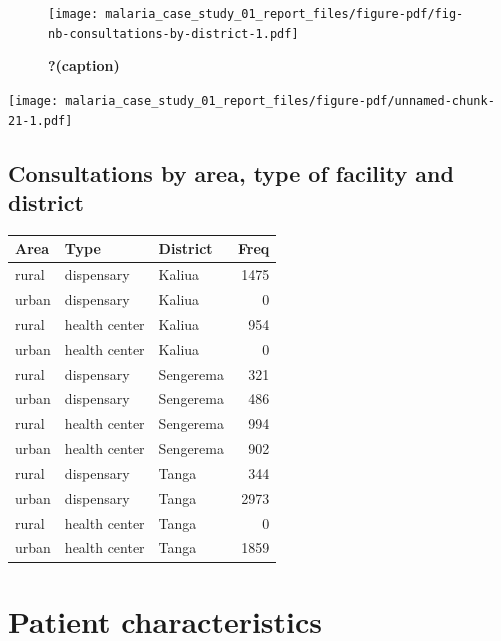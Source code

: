 \documentclass[
  letterpaper,
  DIV=11,
  numbers=noendperiod,
  oneside]{scrreprt}
\begin{document}
\begin{figure}

{\centering \texttt{[image: malaria\_case\_study\_01\_report\_files/figure-pdf/fig-nb-consultations-by-district-1.pdf]}

}

\caption{\label{fig-nb-consultations-by-district}\textbf{?(caption)}}

\end{figure}

\texttt{[image: malaria\_case\_study\_01\_report\_files/figure-pdf/unnamed-chunk-21-1.pdf]}

\hypertarget{consultations-by-area-type-of-facility-and-district}{%
\subsection{Consultations by area, type of facility and
district}\label{consultations-by-area-type-of-facility-and-district}}

\begin{longtable}[]{@{}lllr@{}}
\toprule\noalign{}
Area & Type & District & Freq \\
\midrule\noalign{}
\endhead
\bottomrule\noalign{}
\endlastfoot
rural & dispensary & Kaliua & 1475 \\
urban & dispensary & Kaliua & 0 \\
rural & health center & Kaliua & 954 \\
urban & health center & Kaliua & 0 \\
rural & dispensary & Sengerema & 321 \\
urban & dispensary & Sengerema & 486 \\
rural & health center & Sengerema & 994 \\
urban & health center & Sengerema & 902 \\
rural & dispensary & Tanga & 344 \\
urban & dispensary & Tanga & 2973 \\
rural & health center & Tanga & 0 \\
urban & health center & Tanga & 1859 \\
\end{longtable}

\hypertarget{patient-characteristics}{%
\section{Patient characteristics}\label{patient-characteristics}}
\end{document}
